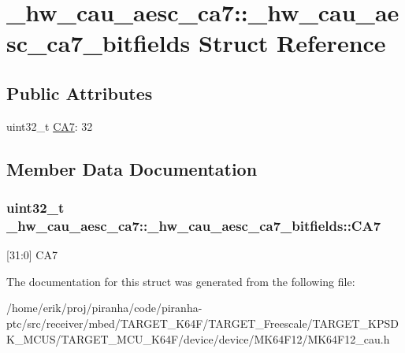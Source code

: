 \hypertarget{struct__hw__cau__aesc__ca7_1_1__hw__cau__aesc__ca7__bitfields}{}\section{\+\_\+hw\+\_\+cau\+\_\+aesc\+\_\+ca7\+:\+:\+\_\+hw\+\_\+cau\+\_\+aesc\+\_\+ca7\+\_\+bitfields Struct Reference}
\label{struct__hw__cau__aesc__ca7_1_1__hw__cau__aesc__ca7__bitfields}
\subsection*{Public Attributes}
\begin{DoxyCompactItemize}
\item 
uint32\+\_\+t \hyperlink{struct__hw__cau__aesc__ca7_1_1__hw__cau__aesc__ca7__bitfields_a53db944bd840d0af1edccbbb7efc11fd}{C\+A7}\+: 32
\end{DoxyCompactItemize}


\subsection{Member Data Documentation}
\subsubsection[{\texorpdfstring{C\+A7}{CA7}}]{\setlength{\rightskip}{0pt plus 5cm}uint32\+\_\+t \+\_\+hw\+\_\+cau\+\_\+aesc\+\_\+ca7\+::\+\_\+hw\+\_\+cau\+\_\+aesc\+\_\+ca7\+\_\+bitfields\+::\+C\+A7}\hypertarget{struct__hw__cau__aesc__ca7_1_1__hw__cau__aesc__ca7__bitfields_a53db944bd840d0af1edccbbb7efc11fd}{}\label{struct__hw__cau__aesc__ca7_1_1__hw__cau__aesc__ca7__bitfields_a53db944bd840d0af1edccbbb7efc11fd}
\mbox{[}31\+:0\mbox{]} C\+A7 

The documentation for this struct was generated from the following file\+:\begin{DoxyCompactItemize}
\item 
/home/erik/proj/piranha/code/piranha-\/ptc/src/receiver/mbed/\+T\+A\+R\+G\+E\+T\+\_\+\+K64\+F/\+T\+A\+R\+G\+E\+T\+\_\+\+Freescale/\+T\+A\+R\+G\+E\+T\+\_\+\+K\+P\+S\+D\+K\+\_\+\+M\+C\+U\+S/\+T\+A\+R\+G\+E\+T\+\_\+\+M\+C\+U\+\_\+\+K64\+F/device/device/\+M\+K64\+F12/M\+K64\+F12\+\_\+cau.\+h\end{DoxyCompactItemize}
